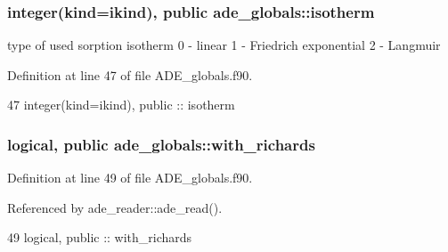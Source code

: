 \subsubsection[{isotherm}]{\setlength{\rightskip}{0pt plus 5cm}integer(kind=ikind), public ade\+\_\+globals\+::isotherm}\label{namespaceade__globals_aaba7d43398b447a5a65c143034f023fb}


type of used sorption isotherm 0 -\/ linear 1 -\/ Friedrich exponential 2 -\/ Langmuir 



Definition at line 47 of file A\+D\+E\+\_\+globals.\+f90.


\begin{DoxyCode}
47   \textcolor{keywordtype}{integer(kind=ikind)}, \textcolor{keywordtype}{public} :: isotherm
\end{DoxyCode}
\subsubsection[{with\+\_\+richards}]{\setlength{\rightskip}{0pt plus 5cm}logical, public ade\+\_\+globals\+::with\+\_\+richards}\label{namespaceade__globals_a1073a745bb8f75538a92005806222d03}


Definition at line 49 of file A\+D\+E\+\_\+globals.\+f90.



Referenced by ade\+\_\+reader\+::ade\+\_\+read().


\begin{DoxyCode}
49   \textcolor{keywordtype}{logical}, \textcolor{keywordtype}{public} :: with_richards
\end{DoxyCode}
